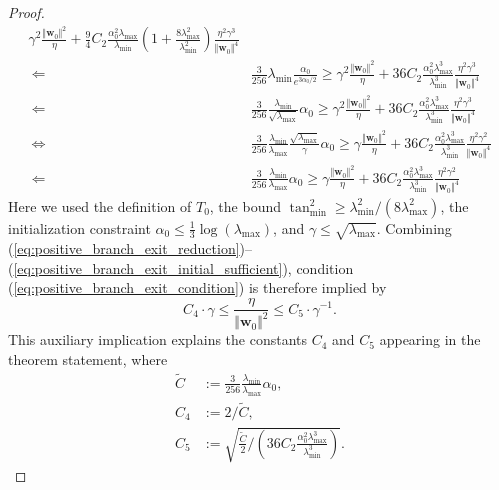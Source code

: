 \documentclass[pdflatex,sn-basic]{sn-jnl}%
\theoremstyle{thmstyleone}%
\begin{document}
\begin{appendices}
\begin{proof}
\begin{equation}
\begin{aligned}
    \gamma^2 \frac{\Vert \mathbf{w}_{0} \Vert^2}{\eta}
    + 
    \frac{9}{4} C_2 \frac{ \alpha_{0}^2 \lambda_{\max}}{\lambda_{\min}}
    \left(
      1+ 
      \frac{8 \lambda_{\max}^2}{\lambda_{\min}^2}
    \right)
    \frac{\eta^2 \gamma^3}{\Vert \mathbf{w}_{0} \Vert^4}  
    \\ 
    \ \boldsymbol{\Leftarrow} \ &
    \frac{3}{256}
    \lambda_{\min}
    \frac{\alpha_0 }{e^{3 \alpha_0 / 2 }}
    \ge 
    \gamma^2 \frac{\Vert \mathbf{w}_{0} \Vert^2}{\eta}
    + 
    36 C_2 \frac{ \alpha_{0}^2 \lambda_{\max}^3}{\lambda_{\min}^3}
    \frac{\eta^2 \gamma^3 }{\Vert \mathbf{w}_{0} \Vert^4 } 
    \\ 
    \ \boldsymbol{\Leftarrow} \ &
    \frac{3}{256}
    \frac{\lambda_{\min}}{\sqrt{\lambda_{\max}}}
    \alpha_0
    \ge 
    \gamma^2 \frac{\Vert \mathbf{w}_{0} \Vert^2}{\eta}
    + 
    36 C_2 \frac{ \alpha_{0}^2 \lambda_{\max}^3}{\lambda_{\min}^3}
    \frac{\eta^2 \gamma^3 }{\Vert \mathbf{w}_{0} \Vert^4 } 
    \\ 
    \ \boldsymbol{\Leftrightarrow} \ &
    \frac{3}{256}
    \frac{{\lambda_{\min}}}{{\lambda_{\max}}}
    \frac{\sqrt{\lambda_{\max}}}{\gamma}
    \alpha_0
    \ge 
    \gamma \frac{\Vert \mathbf{w}_{0} \Vert^2}{\eta}
    + 
    36 C_2 \frac{ \alpha_{0}^2 \lambda_{\max}^3}{\lambda_{\min}^3}
    \frac{\eta^2 \gamma^2 }{\Vert \mathbf{w}_{0} \Vert^4 }
    \\ 
    \ \boldsymbol{\Leftarrow} \ &
    \frac{3}{256}
    \frac{{\lambda_{\min}}}{{\lambda_{\max}}}
    \alpha_0
    \ge 
    \gamma \frac{\Vert \mathbf{w}_{0} \Vert^2}{\eta}
    + 
    36 C_2 \frac{ \alpha_{0}^2 \lambda_{\max}^3}{\lambda_{\min}^3}
    \frac{\eta^2 \gamma^2 }{\Vert \mathbf{w}_{0} \Vert^4 }
  \end{aligned}
  \end{equation}
  Here we used the definition of $T_0$, the bound $\tan_{\min}^2 \ge \lambda_{\min}^2 / (8 \lambda_{\max}^2)$, the initialization constraint $\alpha_0 \le \frac{1}{3} \log(\lambda_{\max})$, and $\gamma \le \sqrt{\lambda_{\max}}$.
  Combining (\ref{eq:positive_branch_exit_reduction})--(\ref{eq:positive_branch_exit_initial_sufficient}), condition (\ref{eq:positive_branch_exit_condition}) is therefore implied by
  \begin{equation*}
    C_4 \cdot \gamma \le 
    \frac{\eta}{\Vert \mathbf{w}_0 \Vert^2} 
    \le C_5 \cdot \gamma^{-1}.
  \end{equation*}
  This auxiliary implication explains the constants $C_4$ and $C_5$ appearing in the theorem statement, where
  \begin{equation*}
  \begin{aligned}
    \tilde{C} & := \frac{3}{256} \frac{\lambda_{\min}}{\lambda_{\max}} \alpha_0,
    \\
    C_4 & := 2 / \tilde{C},
    \\
    C_5 & := 
    \sqrt{
      \frac{\tilde{C}}{2}
      \Big/
      \left(
        36 C_2 \frac{ \alpha_{0}^2 \lambda_{\max}^3}{\lambda_{\min}^3}
      \right)
    }.
  \end{aligned}
  \end{equation*}


\end{proof}
\end{appendices}
\end{document}
